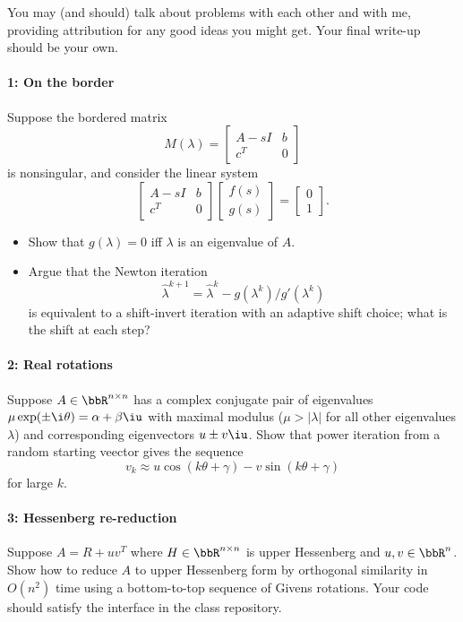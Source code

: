 \documentclass[12pt, leqno]{article} %
\begin{document}

You may (and should) talk about problems with each other and with me,
providing attribution for any good ideas you might get.  Your final
write-up should be your own.


\paragraph*{1: On the border}
Suppose the bordered matrix
\[
  M(\lambda) =
  \begin{bmatrix}
    A-s I & b \\
    c^T & 0
  \end{bmatrix}
\]
is nonsingular, and consider the linear system
\[
  \begin{bmatrix} A-s I & b \\ c^T & 0 \end{bmatrix}
  \begin{bmatrix} f(s) \\ g(s) \end{bmatrix} =
  \begin{bmatrix} 0 \\ 1 \end{bmatrix}.
\]
\begin{itemize}
\item
  Show that $g(\lambda) = 0$ iff $\lambda$ is an eigenvalue of $A$.
\item
  Argue that the Newton iteration
  \[
    \hat{\lambda}^{k+1} = \hat{\lambda}^k - g(\lambda^k)/g'(\lambda^k)
  \]
  is equivalent to a shift-invert iteration with an adaptive shift
  choice; what is the shift at each step?
\end{itemize}

\paragraph*{2: Real rotations}
Suppose $A \in \bbR^{n \times n}$ has a complex conjugate pair of
eigenvalues $\mu \exp(\pm \i\theta) = \alpha + \beta \iu$ with maximal
modulus ($\mu > |\lambda|$ for all other eigenvalues $\lambda$) and
corresponding eigenvectors $u \pm v \iu$.  Show that power iteration
from a random starting veector gives the sequence
\[
  v_k \approx u \cos(k\theta + \gamma) - v \sin(k\theta+\gamma)
\]
for large $k$.

\paragraph*{3: Hessenberg re-reduction}
Suppose $A = R + uv^T$ where $H \in \bbR^{n \times n}$ is upper
Hessenberg and $u, v \in \bbR^n$.  Show how to reduce $A$ to upper
Hessenberg form by orthogonal similarity in $O(n^2)$ time using a
bottom-to-top sequence of Givens rotations.  Your code should satisfy
the interface in the class repository.
\end{document}
